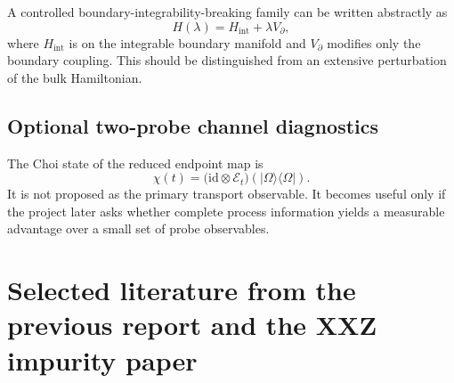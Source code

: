 \documentclass[11pt,a4paper]{article}
\begin{document}
A controlled boundary-integrability-breaking family can be written abstractly as
\begin{equation}
H(\lambda)=H_{\mathrm{int}}+\lambda V_{\partial},
\end{equation}
where $H_{\mathrm{int}}$ is on the integrable boundary manifold and $V_{\partial}$ modifies only the boundary coupling.  This should be distinguished from an extensive perturbation of the bulk Hamiltonian.

\subsection{Optional two-probe channel diagnostics}
The Choi state of the reduced endpoint map is
\begin{equation}
\chi(t)=\bigl(\mathrm{id}\otimes\mathcal E_t\bigr)(|\Omega\rangle\langle\Omega|).
\end{equation}
It is not proposed as the primary transport observable.  It becomes useful only if the project later asks whether complete process information yields a measurable advantage over a small set of probe observables.

\section{Selected literature from the previous report and the XXZ impurity paper}
\end{document}
